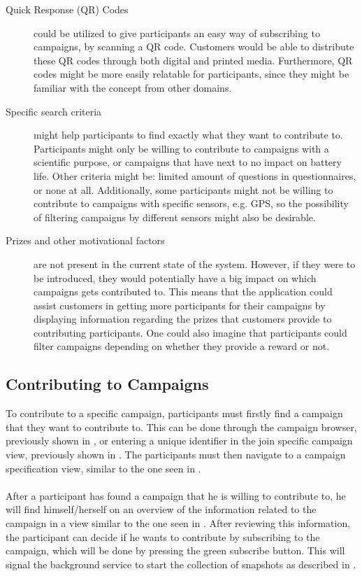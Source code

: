 \begin{description}
    \item[Quick Response (QR) Codes] could be utilized to give participants an easy way of subscribing to campaigns, by scanning a QR code. Customers would be able to distribute these QR codes through both digital and printed media. Furthermore, QR codes might be more easily relatable for participants, since they might be familiar with the concept from other domains.

    \item[Specific search criteria] might help participants to find exactly what they want to contribute to. Participants might only be willing to contribute to campaigns with a scientific purpose, or campaigns that have next to no impact on battery life. Other criteria might be: limited amount of questions in questionnaires, or none at all. Additionally, some participants might not be willing to contribute to campaigns with specific sensors, e.g. GPS, so the possibility of filtering campaigns by different sensors might also be desirable.

    \item[Prizes and other motivational factors] are not present in the current state of the system. However, if they were to be introduced, they would potentially have a big impact on which campaigns gets contributed to. This means that the application could assist customers in getting more participants for their campaigns by displaying information regarding the prizes that customers provide to contributing participants. One could also imagine that participants could filter campaigns depending on whether they provide a reward or not.
\end{description} 

\subsection{Contributing to Campaigns}
\label{sub:contributing_to_campaigns}

To contribute to a specific campaign, participants must firstly find a campaign that they want to contribute to. This can be done through the campaign browser, previously shown in , or entering a unique identifier in the join specific campaign view, previously shown in . The participants must then navigate to a campaign specification view, similar to the one seen in . 
\\\\
After a participant has found a campaign that he is willing to contribute to, he will find himself/herself on an overview of the information related to the campaign in a view similar to the one seen in . After reviewing this information, the participant can decide if he wants to contribute by subscribing to the campaign, which will be done by pressing the green subscribe button. This will signal the background service to start the collection of snapshots as described in .

